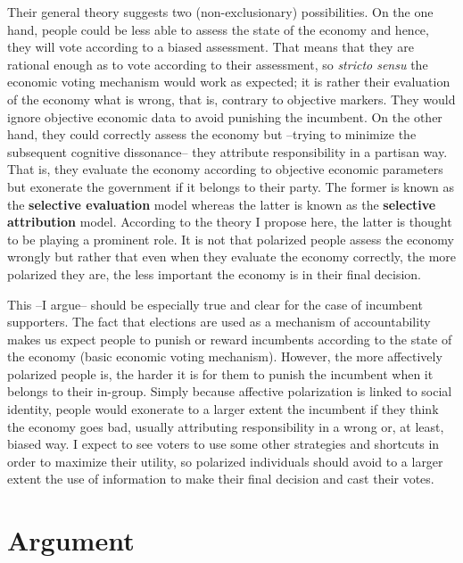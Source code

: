\documentclass[a4paper, svgnames]{article}
\begin{document}
Their general theory suggests two (non-exclusionary) possibilities. On the one hand, people could be less able to assess the state of the economy and hence, they will vote according to a biased assessment. That means that they are rational enough as to vote according to their assessment, so \textit{stricto sensu} the economic voting mechanism would work as expected; it is rather their evaluation of the economy what is wrong, that is, contrary to objective markers. They would ignore objective economic data to avoid punishing the incumbent. On the other hand, they could correctly assess the economy but --trying to minimize the subsequent cognitive dissonance-- they attribute responsibility in a partisan way. That is, they evaluate the economy according to objective economic parameters but exonerate the government if it belongs to their party. The former is known as the \textbf{selective evaluation} model whereas the latter is known as the \textbf{selective attribution} model. According to the theory I propose here, the latter is thought to be playing a prominent role. It is not that polarized people assess the economy wrongly but rather that even when they evaluate the economy correctly, the more polarized they are, the less important the economy is in their final decision.

This --I argue-- should be especially true and clear for the case of incumbent supporters. The fact that elections are used as a mechanism of accountability makes us expect people to punish or reward incumbents according to the state of the economy (basic economic voting mechanism). However, the more affectively polarized people is, the harder it is for them to punish the incumbent when it belongs to their in-group. Simply because affective polarization is linked to social identity, people would exonerate to a larger extent the incumbent if they think the economy goes bad, usually attributing responsibility in a wrong or, at least, biased way. I expect to see voters to use some other strategies and shortcuts in order to maximize their utility, so polarized individuals should avoid to a larger extent the use of information to make their final decision and cast their votes.
\newpage

\section{Argument}
\end{document}
